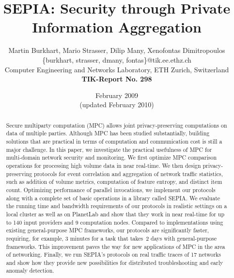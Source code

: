 \documentclass[letterpaper,11pt,onecolumn,titlepage]{article}
\begin{document}
\title{SEPIA: Security through Private Information Aggregation}

\author{
  Martin Burkhart, Mario Strasser, Dilip Many, Xenofontas Dimitropoulos \\ 
  \{burkhart, strasser, dmany, fontas\}@tik.ee.ethz.ch \\
  $\;$ \\
  Computer Engineering and Networks Laboratory,  ETH Zurich, Switzerland  \\
  $\;$ \\
  \textbf{TIK-Report No. 298}
}

\date{February 2009 \\ (updated February 2010)}

\maketitle

\begin{abstract}
Secure multiparty computation (MPC) allows joint privacy-preserving computations on data of 
multiple parties. Although MPC has been studied substantially,
building solutions that are practical in terms of computation and communication cost is
still a major challenge.
In this paper, we investigate the practical usefulness of MPC
for multi-domain network security and monitoring. 
We first optimize MPC comparison operations for processing high volume data in near real-time.
We then design privacy-preserving protocols for event correlation and
aggregation of network traffic statistics, such as addition of volume
metrics, computation of feature entropy, and distinct item count.   
Optimizing performance of parallel invocations, we implement our protocols
along with a complete set of basic operations in a library called SEPIA. We evaluate the running time and
bandwidth requirements of our protocols in realistic settings on a local cluster as well
as on PlanetLab and show
that they work in near real-time for up to 140 input
providers and 9 computation nodes. Compared to implementations using existing general-purpose
MPC frameworks, our protocols are significantly faster, requiring, for
example, 3 minutes for a task that takes~2 days with general-purpose
frameworks. This improvement paves the way for new applications of MPC in the area of networking.
Finally, we run SEPIA's protocols on real traffic traces of 
17 networks and show how they provide new possibilities for distributed troubleshooting and early
anomaly detection.
\end{abstract}
\end{document}
